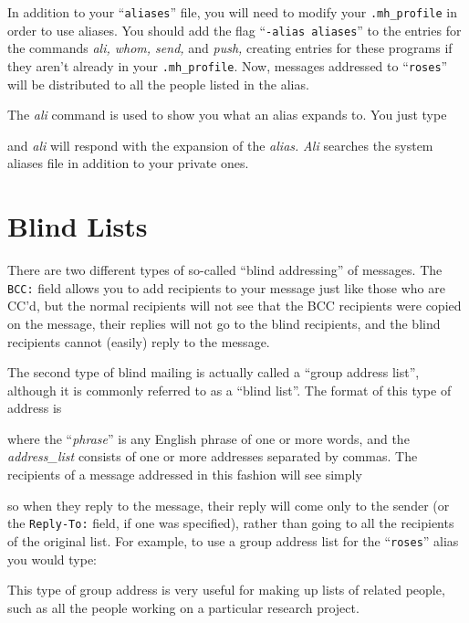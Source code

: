 In addition to your ``{\tt aliases}'' file, you will need to modify your\break
\verb|.mh_profile| in order to use aliases.  You should add the flag
``{\tt -alias aliases}'' to the entries for the commands {\it ali, whom,
send,} and {\it push,} creating entries for these programs if they aren't
already in your \verb|.mh_profile|.
Now, messages addressed to ``{\tt roses}'' will be distributed to all
the people listed in the alias.

The {\it ali\/} command is used to show you what an alias expands to.
You just type


and {\it ali\/} will respond with the expansion of the {\it alias.}  {\it
Ali\/} searches the system aliases file in addition to your private ones.

\section{Blind Lists}

There are two different types of so-called ``blind addressing'' of messages.
The {\tt BCC:} field allows you to add recipients to your message just
like those who are CC'd, but the normal recipients will not see that the
BCC recipients were copied on the message, their replies will not go to the
blind recipients, and the blind recipients cannot (easily) reply to the
message.

The second type of blind mailing is actually called a ``group address list'',
although it is commonly referred to as a ``blind list''.
The format of this type of address is


where the ``{\it phrase\/}'' is any English phrase of one or more words,
and the {\it address\_list\/} consists of one or more addresses separated by
commas.  The recipients of a message addressed in this fashion will
see simply


so when they reply to the message, their reply will come only to the sender
(or the {\tt Reply-To:} field, if one was specified), rather than going to
all the recipients of the original list. For example, to use a group
address list for the ``{\tt roses}'' alias you would type:


This type of group address is very
useful for making up lists of related people, such as all the people working
on a particular research project.



